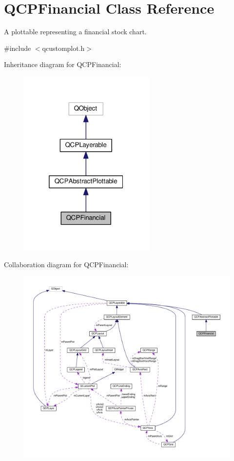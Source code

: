 \hypertarget{classQCPFinancial}{}\section{Q\+C\+P\+Financial Class Reference}
\label{classQCPFinancial}


A plottable representing a financial stock chart.  




{\ttfamily \#include $<$qcustomplot.\+h$>$}



Inheritance diagram for Q\+C\+P\+Financial\+:
\nopagebreak
\begin{figure}[H]
\begin{center}
\leavevmode
\includegraphics[width=193pt]{classQCPFinancial__inherit__graph}
\end{center}
\end{figure}


Collaboration diagram for Q\+C\+P\+Financial\+:
\nopagebreak
\begin{figure}[H]
\begin{center}
\leavevmode
\includegraphics[width=350pt]{classQCPFinancial__coll__graph}
\end{center}
\end{figure}
